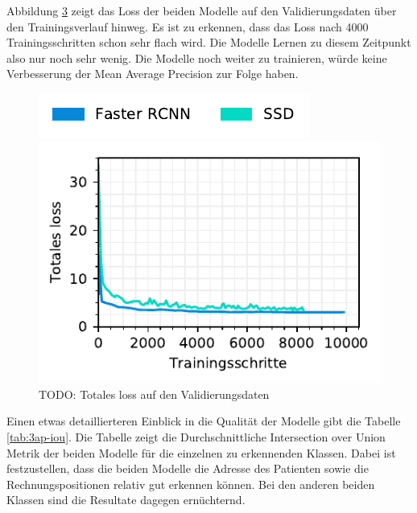 \begin{figure}[H]
\begin{subfigure}[t]{0.5\linewidth}
    \label{fig:3ap-map:map_val}
    \vspace{2ex}
  \end{subfigure}
\end{figure}


Abbildung \ref{fig:3ap-map:loss} zeigt das Loss der beiden Modelle auf den Validierungsdaten über den Trainingsverlauf hinweg. Es ist zu erkennen, dass das Loss nach 4000 Trainingsschritten schon sehr flach wird. Die Modelle Lernen zu diesem Zeitpunkt also nur noch sehr wenig. Die Modelle noch weiter zu trainieren, würde keine Verbesserung der Mean Average Precision zur Folge haben.


\begin{figure}[h!] 
    \captionsetup{width=.9\linewidth}
    \caption{TODO: Totales loss auf den Validierungsdaten}
    \label{fig:3ap-map:loss}
    \centering
    \includegraphics[scale=1]{graphics/matplot/img-detection__legend_1.pdf}
    
    \includegraphics[scale=1]{graphics/matplot/img-detection__all__loss.pdf}
\end{figure}

Einen etwas detaillierteren Einblick in die Qualität der Modelle gibt die Tabelle \ref{tab:3ap-iou}. Die Tabelle zeigt die Durchschnittliche Intersection over Union Metrik der beiden Modelle für die einzelnen zu erkennenden Klassen. Dabei ist festzustellen, dass die beiden Modelle die Adresse des Patienten sowie die Rechnungspositionen relativ gut erkennen können. Bei den anderen beiden Klassen sind die Resultate dagegen ernüchternd.

